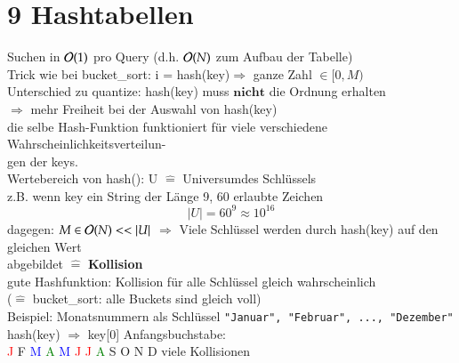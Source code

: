 
\chapter*{9 Hashtabellen}
Suchen in $\mathcal{O}{}(1)$ pro Query (d.h. $\mathcal{O}{}(N)$ zum Aufbau der Tabelle) \\

Trick wie bei bucket\_sort: i = hash(key)$\Rightarrow$ ganze Zahl $\in [0,M)$ \\
\hspace*{5mm} Unterschied zu quantize: hash(key) muss $\textbf{nicht}$ die Ordnung erhalten\\
\hspace*{10mm} $\Rightarrow$ mehr Freiheit bei der Auswahl von hash(key)\\
\hspace*{15mm} die selbe Hash-Funktion funktioniert für viele verschiedene Wahrscheinlichkeitsverteilun- \\
\hspace*{15mm} gen der keys.\\

Wertebereich von hash(): U $\widehat{=}$ \glqq Universum\grqq des Schlüssels \\
\hspace*{5mm} z.B. wenn key ein String der Länge 9, 60 erlaubte Zeichen \\
\[ |U| = 60^9 \approx 10^{16}\]
dagegen: $M \in \mathcal{O}{}(N) << |U|$ $\Rightarrow$ Viele Schlüssel werden durch hash(key) auf den gleichen Wert\\
\hspace*{15mm} abgebildet $\widehat{=}$ \textbf{Kollision}\\
gute Hashfunktion: Kollision für alle Schlüssel gleich wahrscheinlich \\
\hspace*{15mm} ($\widehat{=}$ bucket\_sort: alle Buckets sind gleich voll) \\

Beispiel: Monatsnummern als Schlüssel \verb|"Januar", "Februar", ..., "Dezember"| \\
hash(key) $\Rightarrow$ key[0] Anfangsbuchstabe: \\

\hspace*{10mm} \textcolor{red}{J} \hspace*{5mm}  F \hspace*{5mm}  \textcolor{blue}{M} \hspace*{5mm}  \textcolor{green}{A} \hspace*{5mm}  \textcolor{blue}{M} \hspace*{5mm}  \textcolor{red}{J} \hspace*{5mm}  \textcolor{red}{J} \hspace*{5mm}  \textcolor{green}{A} \hspace*{5mm}
 S \hspace*{5mm}  O \hspace*{5mm}  N \hspace*{5mm}  D \hspace*{10mm} viele Kollisionen \\

